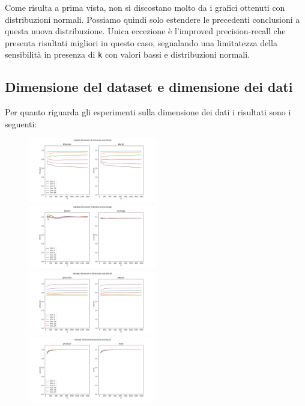 Come risulta a prima vista, non si discostano molto da i grafici ottenuti con distribuzioni normali. Possiamo quindi solo estendere le precedenti conclusioni a questa nuova distribuzione.
Unica eccezione è l'improved precision-recall che presenta risultati migliori in questo caso, segnalando una limitatezza della sensibilità in presenza di \texttt{k} con valori bassi e distribuzioni normali.

\subsection{Dimensione del dataset e dimensione dei dati}

Per quanto riguarda gli esperimenti sulla dimensione dei dati i risultati sono i seguenti:

\begin{figure}[!ht]
    \includegraphics[width=0.5\textwidth]{../images/toyexperiments/ksampledim/sampleDimN_iPrecision_iRecall.png} 
    \includegraphics[width=0.5\textwidth]{../images/toyexperiments/ksampledim/sampleDimN_density_coverage.png} 
    \includegraphics[width=0.5\textwidth]{../images/toyexperiments/ksampledim/sampleDimN_pPrecision_pRecall.png} 
    \includegraphics[width=0.5\textwidth]{../images/toyexperiments/ksampledim/sampleDimN_precision_recall.png} 
\end{figure}


